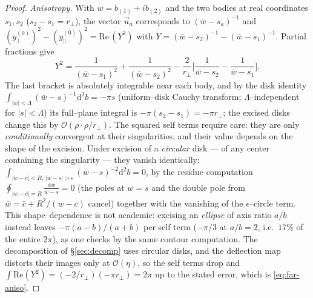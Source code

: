 \documentclass[11pt]{article}
\newcommand{\dd}{\mathrm{d}}
\newcommand{\rp}{r_\perp}
\newcommand{\order}[1]{\mathcal O\!\left(#1\right)}
\begin{document}
\begin{proof}
\emph{Anisotropy.} With $w=b_{(1)}+ib_{(2)}$ and the two bodies at real coordinates $s_1,s_2$
($s_2-s_1=\rp$), the vector $\vec u_a$ corresponds to $(\bar w-s_a)^{-1}$ and
$(y^{(0)}_\perp)^2-(y^{(0)}_\parallel)^2=\mathrm{Re}\,(Y^2)$ with
$Y=(\bar w-s_2)^{-1}-(\bar w-s_1)^{-1}$. Partial fractions give
\begin{equation}
  Y^2=\frac{1}{(\bar w-s_1)^2}+\frac{1}{(\bar w-s_2)^2}
  -\frac{2}{\rp}\Big[\frac{1}{\bar w-s_2}-\frac{1}{\bar w-s_1}\Big].
  \label{eq:Y2}
\end{equation}
The last bracket is absolutely integrable near each body, and by the disk identity
$\int_{|w|<\Lambda}(\bar w-s)^{-1}\dd^2b=-\pi s$ (uniform--disk Cauchy transform; $\Lambda$--independent
for $|s|<\Lambda$) its full--plane integral is $-\pi(s_2-s_1)=-\pi\rp$; the excised disks change
this by $\order{\rho\cdot\rho/\rp}$. The squared self terms require care: they are only
\emph{conditionally} convergent at their singularities, and their value depends on the shape of the
excision. Under excision of a \emph{circular} disk --- of any center containing the singularity ---
they vanish identically:
$\int_{|w-c|<R,\,|w-s|>\epsilon}(\bar w-s)^{-2}\dd^2b=0$, by the residue computation
$\oint_{|w-c|=R}\frac{\dd\bar w}{w-s}=0$ (the poles at $w=s$ and the double pole from
$\bar w=\bar c+R^2/(w-c)$ cancel) together with the vanishing of the $\epsilon$--circle term. This
shape--dependence is not academic: excising an \emph{ellipse} of axis ratio $a/b$ instead leaves
$-\pi(a-b)/(a+b)$ per self term ($-\pi/3$ at $a/b=2$, i.e.\ $17\%$ of the entire $2\pi$), as one
checks by the same contour computation. The decomposition of \S\ref{sec:decomp} uses circular
disks, and the deflection map distorts their images only at $\order{\eta}$, so the self terms drop
and $\int\mathrm{Re}(Y^2)=(-2/\rp)(-\pi\rp)=2\pi$ up to the stated error, which is
\eqref{eq:far-aniso}.


\end{proof}
\end{document}
